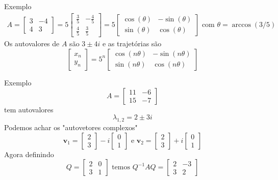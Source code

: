 \documentclass{beamer}
\begin{document}
\begin{frame}{Exemplo}
  \begin{gather*}
    A=\begin{bmatrix}
      3 & -4 \\ 4 & 3
    \end{bmatrix} = 5 \begin{bmatrix}
      \frac{3}{5}&-\frac{4}{5}\\[2mm]
      \frac{4}{5}&\frac{3}{5}
    \end{bmatrix} = 5\begin{bmatrix}
      \cos(\theta) & -\sin(\theta) \\
      \sin(\theta)& \cos(\theta)
    \end{bmatrix} \text{ com } \theta = \arccos(3/5)
  \end{gather*}
  Os autovalores de $A$ são $3 \pm 4i$ e as trajetórias são
  $$ \begin{bmatrix}
    x_n \\ y_n 
  \end{bmatrix} = 5^n\begin{bmatrix}
    \cos(n\theta) & -\sin(n\theta) \\
    \sin(n\theta)& \cos(n\theta)
  \end{bmatrix}$$
  
\end{frame}

\begin{frame}{Exemplo}
  $$ A = \begin{bmatrix}
    11 & - 6\\
    15 & -7
  \end{bmatrix} $$ 
  tem autovalores
  $$ \lambda_{1,2}=2\pm 3i $$
  Podemos achar os "autovetores complexos"
  $$ \mathbf{v}_1 = \begin{bmatrix}
    2 \\ 3
  \end{bmatrix} -i\begin{bmatrix}
    0 \\ 1
  \end{bmatrix} \text{ e }\mathbf{v}_2 = \begin{bmatrix}
    2 \\ 3
  \end{bmatrix} + i\begin{bmatrix}
    0 \\ 1
  \end{bmatrix} $$
  Agora definindo 
  $$ Q= \begin{bmatrix}
    2 & 0 \\
    3 & 1
  \end{bmatrix} \text{ temos } Q^{-1}AQ = \begin{bmatrix}
    2 & -3 \\ 3 & 2
  \end{bmatrix}$$


  
\end{frame}
\end{document}
